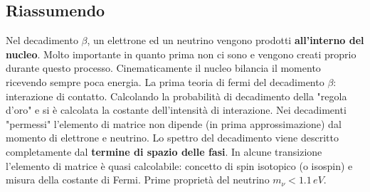 \subsection{Riassumendo}
Nel decadimento $\beta$, un elettrone ed un neutrino vengono prodotti \textbf{all'interno del nucleo}. Molto importante in quanto prima non ci sono e vengono creati proprio durante questo processo. Cinematicamente il nucleo bilancia il momento ricevendo sempre poca energia. La prima teoria di fermi del decadimento $\beta$: interazione di contatto. Calcolando la probabilità di decadimento della "regola d'oro" e si è calcolata la costante dell'intensità di interazione. Nei decadimenti "permessi" l'elemento di matrice non dipende (in prima approssimazione) dal momento di elettrone e neutrino. Lo spettro del decadimento viene descritto completamente dal \textbf{termine di spazio delle fasi}. In alcune transizione l'elemento di matrice è quasi calcolabile: concetto di spin isotopico (o isospin) e misura della costante di Fermi. Prime proprietà del neutrino $m_\nu<1.1\,eV$.
